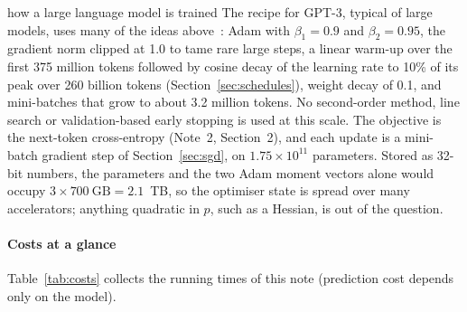 \documentclass[11pt]{article}
\begin{document}
\begin{modern}{how a large language model is trained}
The recipe for GPT-3, typical of large models, uses many of the ideas above~\cite{brown2020}: Adam with $\beta_1 = 0.9$
and $\beta_2 = 0.95$, the gradient norm clipped at 1.0 to tame rare large steps, a linear warm-up over the first 375
million tokens followed by cosine decay of the learning rate to 10\% of its peak over 260 billion tokens
(Section~\ref{sec:schedules}), weight decay of 0.1, and mini-batches that grow to about 3.2 million tokens. No
second-order method, line search or validation-based early stopping is used at this scale. The objective is the next-token cross-entropy (Note~2, Section~2), and each
update is a mini-batch gradient step of Section~\ref{sec:sgd}, on $1.75 \times 10^{11}$ parameters. Stored as 32-bit
numbers, the parameters and the two Adam moment vectors alone would occupy $3 \times 700\ \text{GB} = 2.1$~TB, so the
optimiser state is spread over many accelerators; anything quadratic in $p$, such as a Hessian, is out of the question.
\end{modern}

\paragraph{Costs at a glance} Table~\ref{tab:costs} collects the running times of this note (prediction cost depends
only on the model).
\end{document}
